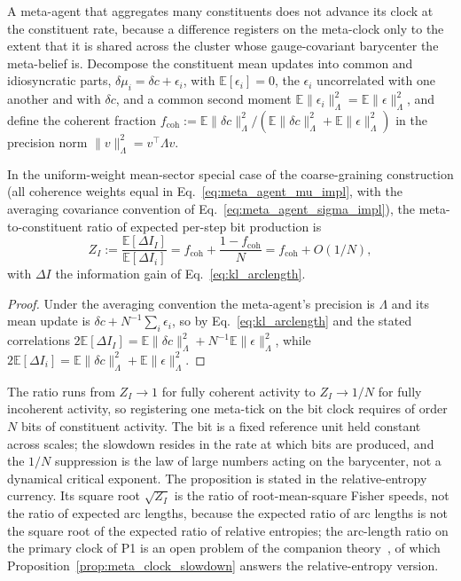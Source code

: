 A meta-agent that aggregates many constituents does not advance its clock at the constituent rate, because a difference registers on the meta-clock only to the extent that it is shared across the cluster whose gauge-covariant barycenter the meta-belief is. Decompose the constituent mean updates into common and idiosyncratic parts, $\delta\mu_i = \delta c + \epsilon_i$, with $\mathbb{E}[\epsilon_i] = 0$, the $\epsilon_i$ uncorrelated with one another and with $\delta c$, and a common second moment $\mathbb{E}\|\epsilon_i\|^2_\Lambda = \mathbb{E}\|\epsilon\|^2_\Lambda$, and define the coherent fraction $f_{\mathrm{coh}} := \mathbb{E}\|\delta c\|^2_\Lambda / (\mathbb{E}\|\delta c\|^2_\Lambda + \mathbb{E}\|\epsilon\|^2_\Lambda)$ in the precision norm $\|v\|^2_\Lambda = v^\top \Lambda v$.
\begin{proposition}\label{prop:meta_clock_slowdown}
In the uniform-weight mean-sector special case of the coarse-graining construction (all coherence weights equal in Eq.~\eqref{eq:meta_agent_mu_impl}, with the averaging covariance convention of Eq.~\eqref{eq:meta_agent_sigma_impl}), the meta-to-constituent ratio of expected per-step bit production is
\begin{equation}
Z_I := \frac{\mathbb{E}[\Delta I_I]}{\mathbb{E}[\Delta I_i]} = f_{\mathrm{coh}} + \frac{1 - f_{\mathrm{coh}}}{N} = f_{\mathrm{coh}} + O(1/N),
\label{eq:bit_production_ratio}
\end{equation}
with $\Delta I$ the information gain of Eq.~\eqref{eq:kl_arclength}.
\end{proposition}
\begin{proof}
Under the averaging convention the meta-agent's precision is $\Lambda$ and its mean update is $\delta c + N^{-1}\sum_i \epsilon_i$, so by Eq.~\eqref{eq:kl_arclength} and the stated correlations $2\mathbb{E}[\Delta I_I] = \mathbb{E}\|\delta c\|^2_\Lambda + N^{-1}\mathbb{E}\|\epsilon\|^2_\Lambda$, while $2\mathbb{E}[\Delta I_i] = \mathbb{E}\|\delta c\|^2_\Lambda + \mathbb{E}\|\epsilon\|^2_\Lambda$.
\end{proof}
The ratio runs from $Z_I \to 1$ for fully coherent activity to $Z_I \to 1/N$ for fully incoherent activity, so registering one meta-tick on the bit clock requires of order $N$ bits of constituent activity. The bit is a fixed reference unit held constant across scales; the slowdown resides in the rate at which bits are produced, and the $1/N$ suppression is the law of large numbers acting on the barycenter, not a dynamical critical exponent. The proposition is stated in the relative-entropy currency. Its square root $\sqrt{Z_I}$ is the ratio of root-mean-square Fisher speeds, not the ratio of expected arc lengths, because the expected ratio of arc lengths is not the square root of the expected ratio of relative entropies; the arc-length ratio on the primary clock of P1 is an open problem of the companion theory~\cite[Ch.~7]{DennisGaugeVFE2026}, of which Proposition~\ref{prop:meta_clock_slowdown} answers the relative-entropy version.

